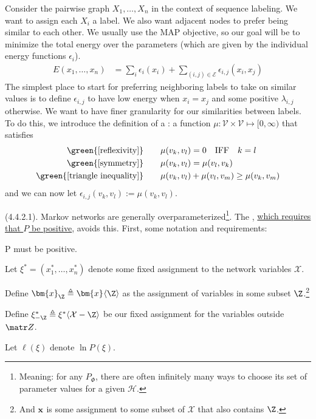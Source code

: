 \documentclass[11pt]{article}
\renewcommand\vec[2][]{\bm{#2}_{#1}}
\newcommand\myspace[1][]{\vspace{#1\bigskipamount}}
\newcommand\p{\Needspace{10\baselineskip} \noindent}
\begin{document}
\begin{example}
	Consider the pairwise graph $X_1,\ldots, X_n$ in the context of sequence labeling. We want to assign each $X_i$ a label. We also want adjacent nodes to prefer being similar to each other. We usually use the MAP objective, so our goal will be to minimize the total energy over the parameters (which are given by the individual energy functions $\epsilon_i$).
	\begin{align}
		E(x_1, \ldots, x_n) &= \sum_i \epsilon_i (x_i) + \sum_{(i,j) \in \mathcal{E}} \epsilon_{i,j}(x_i, x_j)
	\end{align}
	The simplest place to start for preferring neighboring labels to take on similar values is to define $\epsilon_{i,j}$ to have low energy when $x_i = x_j$ and some positive $\lambda_{i,j}$ otherwise. We want to have finer granularity for our similarities between labels. To do this, we introduce the definition of a : a function $\mu : \mathcal V \times \mathcal V \mapsto [0, \infty)$ that satisfies
	\begin{align}
		\green{\text{[reflexivity]}}&  \qquad \mu(v_k, v_l) = 0 \quad \text{IFF} \quad k = l \\
		\green{\text{[symmetry]}}& \qquad \mu(v_k, v_l) = \mu(v_l, v_k) \\
		\green{\text{[triangle inequality]}}& \qquad \mu(v_k, v_l) + \mu(v_l, v_m) \ge \mu(v_k, v_m)
	\end{align}
	and we can now let $\epsilon_{i,j}(v_k, v_l) := \mu(v_k, v_l)$. 
\end{example}

\myspace
\p {} (4.4.2.1). Markov networks are generally overparameterized\footnote{Meaning: for any $P_{\Phi}$, there are often infinitely many ways to choose its set of parameter values for a given $\mathcal H$.}. The , \underline{which requires that $P$ be positive}, avoids this. First, some notation and requirements:
\begin{compactitem}
	\item P must be positive. 
	\item Let $\xi^* = (x_1^*, \ldots, x_n^*)$ denote some fixed assignment to the network variables $\mathcal X$. 
	\item Define $\vec[\Z]{x} \triangleq \vec{x}\langle \Z \rangle$ as the assignment of variables in some subset $\Z$.\footnote{And $\vec x$ is some assignment to some subset of $\mathcal X$ that also contains $\Z$.}
	\item Define $\xi^*_{-\Z} \triangleq \xi^*\langle \mathcal X - \Z \rangle$ be our fixed assignment for the variables outside $\matr Z$. 
	\item Let $\ell(\xi)$ denote $\ln P(\xi)$.  
\end{compactitem}
\end{document}
